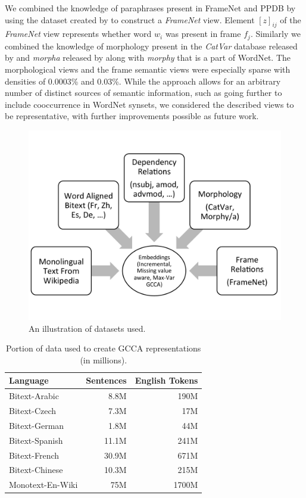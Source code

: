 \documentclass[11pt]{article}
\begin{document}
We combined the knowledge of paraphrases present in FrameNet and PPDB
by using the dataset created by  to
construct a \textit{FrameNet} view. Element $[z]_{ij}$ of the
\textit{FrameNet} view represents whether word $w_i$ was present in
frame $f_j$. Similarly we combined the knowledge of morphology present
in the \textit{CatVar} database released by 
and \textit{morpha} released by  along with \textit{morphy} that is a part of WordNet.
The morphological views and the frame semantic views were especially
sparse with densities of 0.0003\% and 0.03\%. While the approach
allows for an arbitrary number of distinct sources of semantic
information, such as going further to include cooccurrence in WordNet
synsets, we considered the described views to be representative, with
further improvements possible as future work.


\begin{figure}
  \includegraphics[trim=0 70 0 35,clip,width=\linewidth]{cartoonbw.pdf}
  \caption{An illustration of datasets used.}
  \label{fig:cartoon}
  \end{figure}


\begin{table}[htbp]
  \centering
  \begin{tabular}{lrr}
    Language & Sentences & English Tokens \\
    \hline
    Bitext-Arabic   & 8.8M   & 190M  \\
    Bitext-Czech    & 7.3M   & 17M   \\
    Bitext-German   & 1.8M   & 44M   \\
    Bitext-Spanish  & 11.1M  & 241M  \\
    Bitext-French   & 30.9M  & 671M  \\
    Bitext-Chinese  & 10.3M  & 215M  \\
    Monotext-En-Wiki& 75M    & 1700M
  \end{tabular}
  \caption{Portion of data used to create GCCA representations (in millions).}
  \label{tab:dataperlang}
\end{table}
\end{document}
